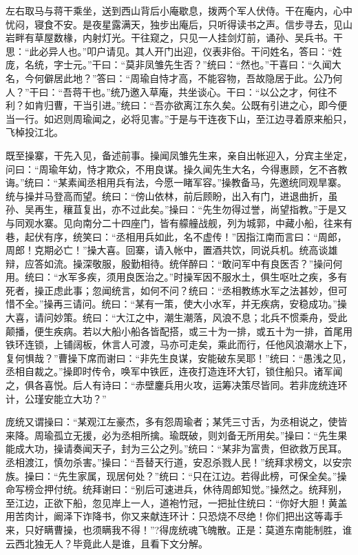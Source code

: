 左右取马与蒋干乘坐，送到西山背后小庵歇息，拨两个军人伏侍。干在庵内，心中忧闷，寝食不安。是夜星露满天，独步出庵后，只听得读书之声。信步寻去，见山岩畔有草屋数椽，内射灯光。干往窥之，只见一人挂剑灯前，诵孙、吴兵书。干思：“此必异人也。”叩户请见。其人开门出迎，仪表非俗。干问姓名，答曰：“姓庞，名统，字士元。”干曰：“莫非凤雏先生否？”统曰：“然也。”干喜曰：“久闻大名，今何僻居此地？”答曰：“周瑜自恃才高，不能容物，吾故隐居于此。公乃何人？”干曰：“吾蒋干也。”统乃邀入草庵，共坐谈心。干曰：“以公之才，何往不利？如肯归曹，干当引进。”统曰：“吾亦欲离江东久矣。公既有引进之心，即今便当一行。如迟则周瑜闻之，必将见害。”于是与干连夜下山，至江边寻着原来船只，飞棹投江北。

既至操寨，干先入见，备述前事。操闻凤雏先生来，亲自出帐迎入，分宾主坐定，问曰：“周瑜年幼，恃才欺众，不用良谋。操久闻先生大名，今得惠顾，乞不吝教诲。”统曰：“某素闻丞相用兵有法，今愿一睹军容。”操教备马，先邀统同观旱寨。统与操并马登高而望。统曰：“傍山依林，前后顾盼，出入有门，进退曲折，虽孙、吴再生，穰苴复出，亦不过此矣。”操曰：“先生勿得过誉，尚望指教。”于是又与同观水寨。见向南分二十四座门，皆有艨艟战舰，列为城郭，中藏小船，往来有巷，起伏有序，统笑曰：“丞相用兵如此，名不虚传！”因指江南而言曰：“周郎，周郎！克期必亡！”操大喜。回寨，请入帐中，置酒共饮，同说兵机。统高谈雄辩，应答如流。操深敬服，殷勤相待。统佯醉曰：“敢问军中有良医否？”操问何用。统曰：“水军多疾，须用良医治之。”时操军因不服水土，俱生呕吐之疾，多有死者，操正虑此事；忽闻统言，如何不问？统曰：“丞相教练水军之法甚妙，但可惜不全。”操再三请问。统曰：“某有一策，使大小水军，并无疾病，安稳成功。”操大喜，请问妙策。统曰：“大江之中，潮生潮落，风浪不息；北兵不惯乘舟，受此颠播，便生疾病。若以大船小船各皆配搭，或三十为一排，或五十为一排，首尾用铁环连锁，上铺阔板，休言人可渡，马亦可走矣，乘此而行，任他风浪潮水上下，复何惧哉？”曹操下席而谢曰：“非先生良谋，安能破东吴耶！”统曰：“愚浅之见，丞相自裁之。”操即时传令，唤军中铁匠，连夜打造连环大钉，锁住船只。诸军闻之，俱各喜悦。后人有诗曰：“赤壁鏖兵用火攻，运筹决策尽皆同。若非庞统连环计，公瑾安能立大功？”

庞统又谓操曰：“某观江左豪杰，多有怨周瑜者；某凭三寸舌，为丞相说之，使皆来降。周瑜孤立无援，必为丞相所擒。瑜既破，则刘备无所用矣。”操曰：“先生果能成大功，操请奏闻天子，封为三公之列。”统曰：“某非为富贵，但欲救万民耳。丞相渡江，慎勿杀害。”操曰：“吾替天行道，安忍杀戮人民！”统拜求榜文，以安宗族。操曰：“先生家属，现居何处？”统曰：“只在江边。若得此榜，可保全矣。”操命写榜佥押付统。统拜谢曰：“别后可速进兵，休待周郎知觉。”操然之。统拜别，至江边，正欲下船，忽见岸上一人，道袍竹冠，一把扯住统曰：“你好大胆！黄盖用苦肉计，阚泽下诈降书，你又来献连环计：只恐烧不尽绝！你们把出这等毒手来，只好瞒曹操，也须瞒我不得！”?得庞统魂飞魄散。正是：莫道东南能制胜，谁云西北独无人？毕竟此人是谁，且看下文分解。
